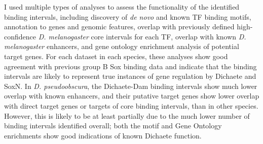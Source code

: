 I used multiple types of analyses to assess the functionality of the identified binding intervals, including discovery of \emph{de novo} and known TF binding motifs, annotation to genes and genomic features, overlap with previously defined high-confidence \emph{D. melanogaster} core intervals for each TF, overlap with known \emph{D. melanogaster} enhancers, and gene ontology enrichment analysis of potential target genes. For each dataset in each species, these analyses show good agreement with previous group B Sox binding data and indicate that the binding intervals are likely to represent true instances of gene regulation by Dichaete and SoxN. In \emph{D. pseudoobscura}, the Dichaete-Dam binding intervals show much lower overlap with known enhancers, and their putative target genes show lower overlap with direct target genes or targets of core binding intervals, than in other species. However, this is likely to be at least partially due to the much lower number of binding intervals identified overall; both the motif and Gene Ontology enrichments show good indications of known Dichaete function.\\

